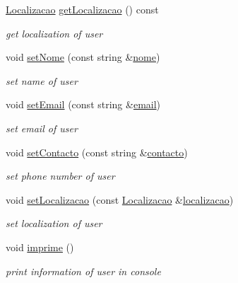 \begin{DoxyCompactItemize}
\hyperlink{class_localizacao}{Localizacao} \hyperlink{class_utilizador_a2f72c346267d8cb2bc883e8af2905020}{get\+Localizacao} () const 
\begin{DoxyCompactList}\small\item\em get localization of user \end{DoxyCompactList}\item 
void \hyperlink{class_utilizador_a757fdfb4deb2f38879a81e0cf9930520}{set\+Nome} (const string \&\hyperlink{class_utilizador_a3d22333263aef7b7a61a96b46ba7828d}{nome})
\begin{DoxyCompactList}\small\item\em set name of user \end{DoxyCompactList}\item 
void \hyperlink{class_utilizador_ae56c0e10e0600f7f56b9c3bae536dd74}{set\+Email} (const string \&\hyperlink{class_utilizador_acbfe7f9a279131a567de9c85f00df332}{email})
\begin{DoxyCompactList}\small\item\em set email of user \end{DoxyCompactList}\item 
void \hyperlink{class_utilizador_a0d865c0665b6cc8d828e50b675be8a3a}{set\+Contacto} (const string \&\hyperlink{class_utilizador_a15e6d87267bff22599a28ac069d6a210}{contacto})
\begin{DoxyCompactList}\small\item\em set phone number of user \end{DoxyCompactList}\item 
void \hyperlink{class_utilizador_acc7de3615eff00f50c683ebf33305a77}{set\+Localizacao} (const \hyperlink{class_localizacao}{Localizacao} \&\hyperlink{class_utilizador_a0bd3436ff45c7f80236d591f750c5522}{localizacao})
\begin{DoxyCompactList}\small\item\em set localization of user \end{DoxyCompactList}\item 
\hypertarget{class_utilizador_a669d9c086d1aa44bf228f605bf68023f}{}void \hyperlink{class_utilizador_a669d9c086d1aa44bf228f605bf68023f}{imprime} ()\label{class_utilizador_a669d9c086d1aa44bf228f605bf68023f}

\begin{DoxyCompactList}\small\item\em print information of user in console \end{DoxyCompactList}\end{DoxyCompactItemize}
